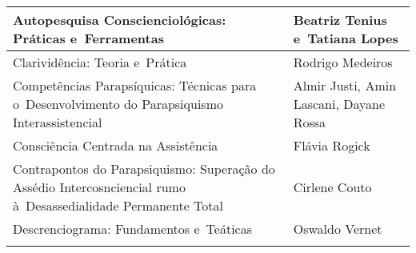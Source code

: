 \documentclass{gescons}
\begin{document}
\begin{longtable}[]{@{}
  >{\raggedright\arraybackslash}p{}
  >{\raggedright\arraybackslash}p{}@{}}
\hline
\begin{minipage}[b]{\linewidth}\raggedright
Autopesquisa Conscienciológicas: Práticas e~Ferramentas
\end{minipage} & \begin{minipage}[b]{\linewidth}\raggedright
Beatriz Tenius e~Tatiana Lopes
\end{minipage} \\
\hline
\begin{minipage}[b]{\linewidth}\raggedright
Clarividência: Teoria e~Prática
\end{minipage} & \begin{minipage}[b]{\linewidth}\raggedright
Rodrigo Medeiros
\end{minipage} \\
\hline
\begin{minipage}[b]{\linewidth}\raggedright\addlinespace[2pt]
Competências Parapsíquicas: Técnicas para o~Desenvolvimento do Parapsiquismo Interassistencial
\end{minipage} & \begin{minipage}[b]{\linewidth}\raggedright
Almir Justi, Amin Lascani, Dayane Rossa
\end{minipage} \\
\hline
\begin{minipage}[b]{\linewidth}\raggedright
Consciência Centrada na Assistência
\end{minipage} & \begin{minipage}[b]{\linewidth}\raggedright
Flávia Rogick
\end{minipage} \\
\hline
\begin{minipage}[b]{\linewidth}\raggedright\addlinespace[2pt]
Contrapontos do Parapsiquismo: Superação do Assédio Intercosnciencial rumo à~Desassedialidade Permanente Total
\end{minipage} & \begin{minipage}[b]{\linewidth}\raggedright
Cirlene Couto
\end{minipage} \\
\hline
\begin{minipage}[b]{\linewidth}\raggedright
Descrenciograma: Fundamentos e~Teáticas
\end{minipage} & \begin{minipage}[b]{\linewidth}\raggedright
Oswaldo Vernet
\end{minipage} \\
\hline
\begin{minipage}[b]{\linewidth}\raggedright

\end{minipage}
\end{longtable}
\end{document}
